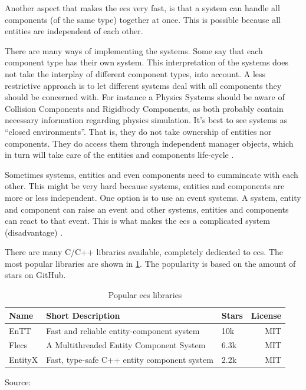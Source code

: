 \documentclass{projdoc}
\begin{document}
Another aspect that makes the \gls{ecs} very fast, is that a system can handle all
components (of the same type) together at once. This is possible because all entities
are independent of each other.

There are many ways of implementing the systems. Some say that each component type
has their own system. This interpretation of the systems does not take the interplay
of different component types, into account. A less restrictive approach is to let
different systems deal with all components they should be concerned with. For
instance a Physics Systems should be aware of Collision Components and Rigidbody
Components, as both probably contain necessary information regarding physics
simulation. It's best to see systems as ``closed environments''. That is, they do not
take ownership of entities nor components. They do access them through independent
manager objects, which in turn will take care of the entities and components
life-cycle \autocite{man:ECSExplanation}.

Sometimes systems, entities and even components need to cummincate with each other.
This might be very hard because systems, entities and components are more or less
independent. One option is to use an event systems. A system, entity and component
can raise an event and other systems, entities and components can react to that
event. This is what makes the \gls{ecs} a complicated system (disadvantage)
\autocite{man:ECSExplanation}.

There are many C/C++ libraries available, completely dedicated to \gls{ecs}. The most
popular libraries are shown in \cref{tab:popularECSLibraries}. The popularity is
based on the amount of stars on GitHub.

\begin{table}
	\centering
	\begin{tabular}{ll@{\qquad}lr}
		\toprule
		\textbf{Name} & \textbf{Short Description} & \textbf{Stars} & \textbf{License}\\
		\midrule
		EnTT & Fast and reliable entity-component system & 10k & MIT\\
		Flecs & A Multithreaded Entity Component System & 6.3k & MIT\\
		EntityX & Fast, type-safe C++ entity component system & 2.2k & MIT\\
		\bottomrule
	\end{tabular}
	\caption{Popular \gls{ecs} libraries}
	Source: \autocite{github:awesome-ecs}
	\label{tab:popularECSLibraries}
\end{table}
\end{document}
